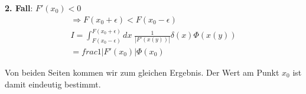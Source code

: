 \textbf{2. Fall}: $F'\left(x_0\right) < 0$
\begin{align}
\Rightarrow F \left(x_0 + \epsilon \right) < F \left(x_0 - \epsilon \right) \\
I = \int_{F\left(x_0-\epsilon\right)}^{F\left(x_0+\epsilon\right)} dx \;
\frac{1}{|F' \left(x\left(y\right) \right)|} \delta \left(x\right) \Phi
\left(x\left(y\right) \right) \\
= frac{1}{|F' \left(x_0\right)|} \Phi \left(x_0\right)
\end{align}

Von beiden Seiten kommen wir zum gleichen Ergebnis. Der Wert am Punkt $x_0$ ist
damit eindeutig bestimmt.

